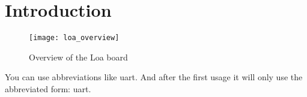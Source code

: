 
\chapter{Introduction}

\blindtext

\begin{figure}[htpb]
\centering
\texttt{[image: loa\_overview]}
\caption{Overview of the Loa board}
\label{fig:overview}
\end{figure}

You can use abbreviations like \ac{uart}. And after the first usage it will only use the abbreviated form: \ac{uart}.

\blindtext[4]

